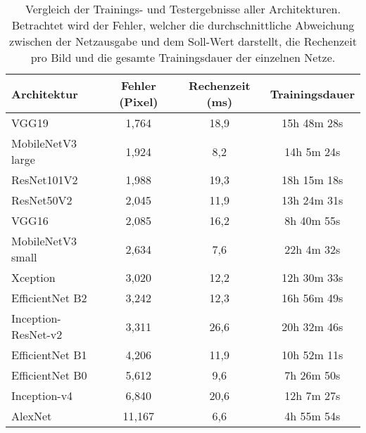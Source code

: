 \begin{table}[ht]
\begin{center}
\begin{tabular}{l|c|c|c}
\textbf{Architektur} & \textbf{Fehler (Pixel)} & \textbf{Rechenzeit (ms)} & \textbf{Trainingsdauer} \\ \hline
VGG19                & 1,764                   & 18,9                     & 15h 48m 28s             \\ \hline
MobileNetV3 large    & 1,924                   & 8,2                      & 14h 5m 24s              \\ \hline
ResNet101V2          & 1,988                   & 19,3                     & 18h 15m 18s             \\ \hline
ResNet50V2           & 2,045                   & 11,9                     & 13h 24m 31s             \\ \hline
VGG16                & 2,085                   & 16,2                     & 8h 40m 55s              \\ \hline
MobileNetV3 small    & 2,634                   & 7,6                      & 22h 4m 32s              \\ \hline
Xception             & 3,020                   & 12,2                     & 12h 30m 33s             \\ \hline
EfficientNet B2      & 3,242                   & 12,3                     & 16h 56m 49s             \\ \hline
Inception-ResNet-v2  & 3,311                   & 26,6                     & 20h 32m 46s             \\ \hline
EfficientNet B1      & 4,206                   & 11,9                     & 10h 52m 11s             \\ \hline
EfficientNet B0      & 5,612                   & 9,6                      & 7h 26m 50s              \\ \hline
Inception-v4         & 6,840                   & 20,6                     & 12h 7m 27s              \\ \hline
AlexNet              & 11,167                  & 6,6                      & 4h 55m 54s             
\end{tabular}
\caption{Vergleich der Trainings- und Testergebnisse aller Architekturen. Betrachtet wird der Fehler, welcher die durchschnittliche Abweichung zwischen der Netzausgabe und dem Soll-Wert darstellt, die Rechenzeit pro Bild und die gesamte Trainingsdauer der einzelnen Netze.}
\label{Tab:vergleich-netze}
\end{center}
\end{table}